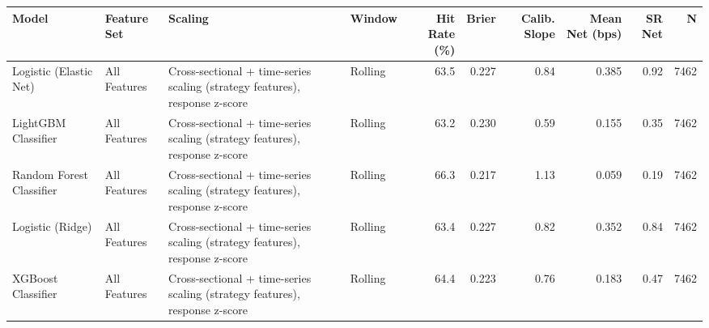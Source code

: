 \begin{tabular}{llllrrrrrr}
\toprule
Model & Feature Set & Scaling & Window & Hit Rate (\%) & Brier & Calib. Slope & Mean Net (bps) & SR Net & N \\
\midrule
Logistic (Elastic Net) & All Features & Cross-sectional + time-series scaling (strategy features), response z-score & Rolling & 63.5 & 0.227 & 0.84 & 0.385 & 0.92 & 7462 \\
LightGBM Classifier & All Features & Cross-sectional + time-series scaling (strategy features), response z-score & Rolling & 63.2 & 0.230 & 0.59 & 0.155 & 0.35 & 7462 \\
Random Forest Classifier & All Features & Cross-sectional + time-series scaling (strategy features), response z-score & Rolling & 66.3 & 0.217 & 1.13 & 0.059 & 0.19 & 7462 \\
Logistic (Ridge) & All Features & Cross-sectional + time-series scaling (strategy features), response z-score & Rolling & 63.4 & 0.227 & 0.82 & 0.352 & 0.84 & 7462 \\
XGBoost Classifier & All Features & Cross-sectional + time-series scaling (strategy features), response z-score & Rolling & 64.4 & 0.223 & 0.76 & 0.183 & 0.47 & 7462 \\
\bottomrule
\end{tabular}
